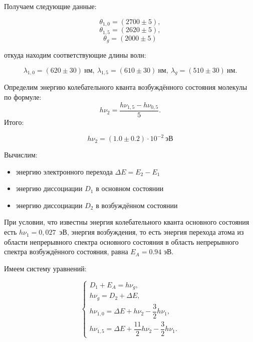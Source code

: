         Получаем следующие данные:
		
		\[	\theta_{1,0}=(2700\pm 5), \] 
        \[  \theta_{1,5}=(2620\pm 5), \] 
        \[  \theta_g=(2000\pm 5)  \]
		
		 откуда находим соответствующие длины волн: 
		 
		 \begin{equation*}
		 	\lambda_{1,0}=(620\pm 30) \ \text{нм}, \ \lambda_{1,5}=(610\pm 30) \ \text{нм}, \ \lambda_g=(510\pm 30)\ \text{нм}.
		 \end{equation*}
		
		Определим энергию колебательного кванта возбуждённого состояния молекулы по формуле: 
		\begin{equation*}
			h \nu_2=\dfrac{h\nu_{1,5}-h \nu_{0,5}}{5}.
		\end{equation*}
		Итого:
		
		\[	h\nu_2=(1.0\pm 0.2)\cdot 10^{-2} \ \text{эВ} \]
			
		Вычислим:
        \begin{itemize}
            \item энергию электронного перехода $\Delta E=E_2-E_1$
            \item энергию диссоциации $D_1$ в основном состоянии
            \item энергию диссоциации $D_2$ в возбуждённом состоянии
        \end{itemize}

        При условии, что известны энергия колебательного кванта основного состояния есть $h\nu_1=0,027$~эВ, 
        энергия возбуждения, то есть энергия перехода атома из области непрерывного спектра основного состояния в область непрерывного спектра возбуждённого состояния, равна $E_A=0.94$ эВ.\\
		
        \newpage

        Имеем систему уравнений:

		\begin{equation*}
			\begin{cases}
				D_1+E_A=h \nu_g,\\

				h\nu_g=D_2+\Delta E,\\

				h\nu_{1,0}=\Delta E+h\nu_2-\dfrac{3}{2}h\nu_1,\\

				h\nu_{1,5}=\Delta E+\dfrac{11}{2}h\nu_2-\dfrac{3}{2}h\nu_1.

			\end{cases}
		\end{equation*}

